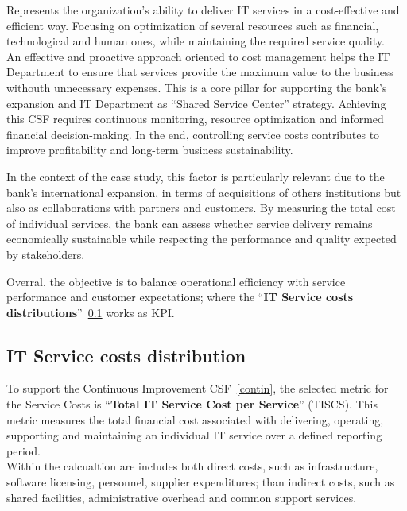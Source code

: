 Represents the organization's ability to deliver IT services in a cost-effective and efficient way. Focusing on optimization of several resources such as financial, technological and human ones, while maintaining the required service quality. \\
An effective and proactive approach oriented to cost management helps the IT Department to ensure that services provide the maximum value to the business withouth unnecessary expenses. This is a core pillar for supporting the bank's expansion and IT Department as ``Shared Service Center'' strategy.
Achieving this CSF requires continuous monitoring, resource optimization and informed financial decision-making. In the end, controlling service costs contributes to improve profitability and long-term business sustainability.



In the context of the case study, this factor is particularly relevant due to the bank's international expansion, in terms of acquisitions of others institutions but also as collaborations with partners and customers. By measuring the total cost of individual services, the bank can assess whether service delivery remains economically sustainable while respecting the performance and quality expected by stakeholders.


Overral, the objective is to balance operational efficiency with service performance and customer expectations; where the ``\textbf{IT Service costs distributions}''~\ref{sub:itservicecost} works as KPI.




\subsection{IT Service costs distribution}
\label{sub:itservicecost}

To support the Continuous Improvement CSF~\ref{contin}, the selected metric for the Service Costs is ``\textbf{Total IT Service Cost per Service}'' (TISCS). This metric measures the total financial cost associated with delivering, operating, supporting and maintaining an individual IT service over a defined reporting period. \\
Within the calcualtion are includes both direct costs, such as infrastructure, software licensing, personnel, supplier expenditures; than indirect costs, such as shared facilities, administrative overhead and common support services. \\

